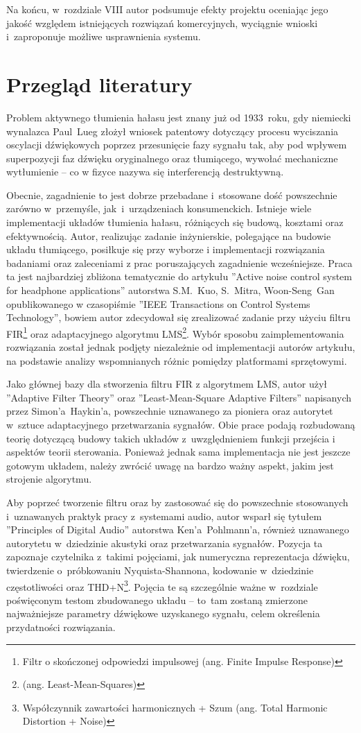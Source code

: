 Na końcu, w~rozdziale VIII autor podsumuje efekty projektu oceniając jego jakość względem istniejących rozwiązań komercyjnych, wyciągnie wnioski i~zaproponuje możliwe usprawnienia systemu.
\section{Przegląd literatury}
Problem aktywnego tłumienia hałasu jest znany już od 1933~roku, gdy niemiecki wynalazca Paul~Lueg złożył wniosek patentowy\cite{LuegPatent} dotyczący procesu wyciszania oscylacji dźwiękowych poprzez przesunięcie fazy sygnału tak, aby pod wpływem superpozycji faz dźwięku oryginalnego oraz tłumiącego, wywołać mechaniczne wytłumienie -- co w fizyce nazywa się interferencją destruktywną.

Obecnie, zagadnienie to jest dobrze przebadane i~stosowane dość powszechnie zarówno w~przemyśle, jak~i~urządzeniach konsumenckich. Istnieje wiele implementacji układów tłumienia hałasu, różniących się budową, kosztami oraz efektywnością. Autor, realizując zadanie inżynierskie, polegające na budowie układu tłumiącego, posiłkuje się przy wyborze i implementacji rozwiązania badaniami oraz zaleceniami z prac poruszających zagadnienie wcześniejsze. Praca ta jest najbardziej zbliżona tematycznie do artykułu ''Active noise control system for headphone applications'' autorstwa S.M.~Kuo, S.~Mitra, Woon-Seng~Gan opublikowanego w czasopiśmie ''IEEE Transactions on Control Systems Technology'', bowiem autor zdecydował się zrealizować zadanie przy użyciu filtru FIR\footnote{Filtr o skończonej odpowiedzi impulsowej (ang. Finite Impulse Response)} oraz  adaptacyjnego algorytmu LMS\footnote{%
(ang. Least-Mean-Squares)}. Wybór sposobu zaimplementowania rozwiązania został jednak podjęty niezależnie od implementacji autorów artykułu, na podstawie analizy wspomnianych różnic pomiędzy platformami sprzętowymi.

Jako głównej bazy dla stworzenia filtru FIR z algorytmem LMS, autor użył ''Adaptive Filter Theory'' oraz ''Least-Mean-Square Adaptive Filters'' napisanych przez Simon'a~Haykin'a, powszechnie uznawanego za pioniera oraz autorytet w~sztuce adaptacyjnego przetwarzania sygnałów. Obie prace podają rozbudowaną teorię dotyczącą budowy takich układów z~uwzględnieniem funkcji przejścia i aspektów teorii sterowania. Ponieważ jednak sama implementacja nie jest jeszcze gotowym układem, należy zwrócić uwagę na bardzo ważny aspekt, jakim jest strojenie algorytmu.

Aby poprzeć tworzenie filtru oraz by zastosować się do powszechnie stosowanych i~uznawanych praktyk pracy z~systemami audio, autor wsparł się tytułem ''Principles of Digital Audio'' autorstwa Ken'a~Pohlmann'a, również uznawanego autorytetu w~dziedzinie akustyki oraz przetwarzania sygnałów. Pozycja ta zapoznaje czytelnika z~takimi pojęciami, jak numeryczna reprezentacja d\'zwięku, twierdzenie o~próbkowaniu Nyquista-Shannona, kodowanie w~dziedzinie częstotliwości oraz THD+N\footnote{Współczynnik zawartości harmonicznych + Szum	(ang. Total Harmonic Distortion + Noise)}. Pojęcia te są szczególnie ważne w~rozdziale poświęconym testom zbudowanego układu -- to~tam zostaną zmierzone najważniejsze parametry d\'zwiękowe uzyskanego sygnału, celem określenia przydatności rozwiązania.

